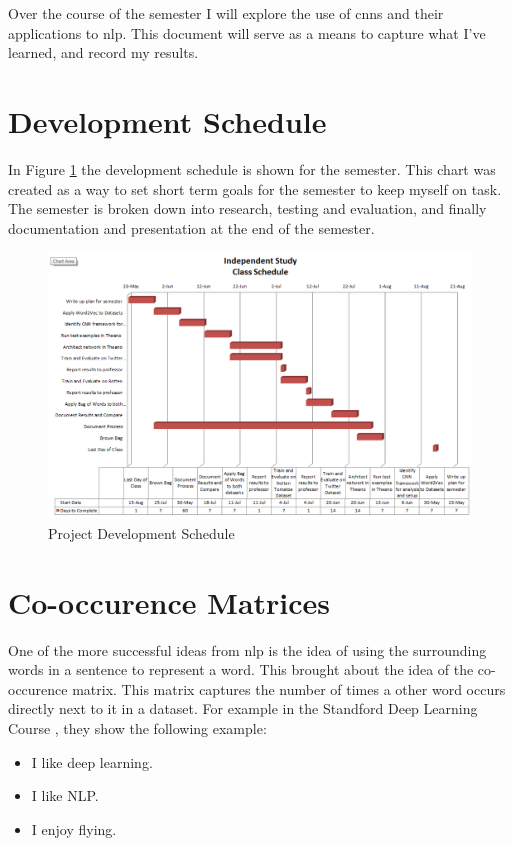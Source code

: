 \documentclass[12pt]{article}
\begin{document}
Over the course of the semester I will explore the use of \ac{cnn}s and their applications to \ac{nlp}. This document will serve as a means to capture what I've learned, and record my results. 

\section{Development Schedule}

In Figure \ref{fig:schedule} the development schedule is shown for the semester. This chart was created as a way to set short term goals for the semester to keep myself on task. The semester is broken down into research, testing and evaluation, and finally documentation and presentation at the end of the semester. 

\begin{figure}[htbp!]
  \centering
  \includegraphics[scale=.5]{gantt.PNG}
  \caption{Project Development Schedule}
  \label{fig:schedule}
\end{figure}


\section{Co-occurence Matrices}

One of the more successful ideas from \ac{nlp} is the idea of using the surrounding words in a sentence to represent a word. This brought about the idea of the co-occurence matrix. This matrix captures the number of times a other word occurs directly next to it in a dataset. For example in the Standford Deep Learning Course \cite{dl_course}, they show the following example:

\begin{itemize}
	\item I like deep learning.
	\item I like NLP.
	\item I enjoy flying.
\end{itemize}
\end{document}
